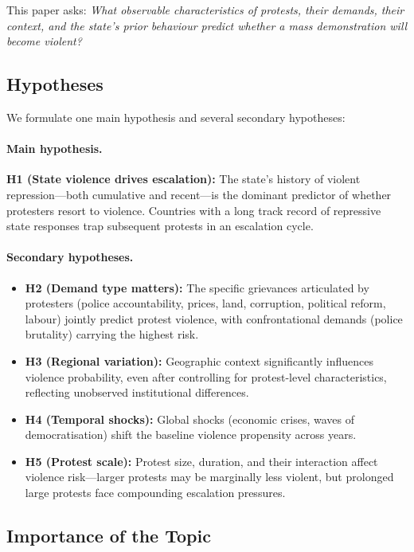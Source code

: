 \documentclass[12pt,a4paper]{article}
\begin{document}
This paper asks: \emph{What observable characteristics of protests, their demands, their context, and the state's prior behaviour predict whether a mass demonstration will become violent?}

\subsection{Hypotheses}

We formulate one main hypothesis and several secondary hypotheses:

\paragraph{Main hypothesis.}
\textbf{H1 (State violence drives escalation):} The state's history of violent repression---both cumulative and recent---is the dominant predictor of whether protesters resort to violence. Countries with a long track record of repressive state responses trap subsequent protests in an escalation cycle.

\paragraph{Secondary hypotheses.}
\begin{itemize}
  \item \textbf{H2 (Demand type matters):} The specific grievances articulated by protesters (police accountability, prices, land, corruption, political reform, labour) jointly predict protest violence, with confrontational demands (police brutality) carrying the highest risk.
  \item \textbf{H3 (Regional variation):} Geographic context significantly influences violence probability, even after controlling for protest-level characteristics, reflecting unobserved institutional differences.
  \item \textbf{H4 (Temporal shocks):} Global shocks (economic crises, waves of democratisation) shift the baseline violence propensity across years.
  \item \textbf{H5 (Protest scale):} Protest size, duration, and their interaction affect violence risk---larger protests may be marginally less violent, but prolonged large protests face compounding escalation pressures.
\end{itemize}

\subsection{Importance of the Topic}
\end{document}
